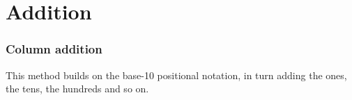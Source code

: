 




\section{Addition}

\subsubsection{Column addition}
This method builds on the base-10 positional notation, in turn adding the ones, the tens, the hundreds and so on.
\begin{center}
	\parbox{0.3\linewidth}{
}\qquad
\parbox{0.3\linewidth}{
}\\[12pt]
\parbox{0.3\linewidth}{
}\qquad
\parbox{0.3\linewidth}{
}
\end{center}
